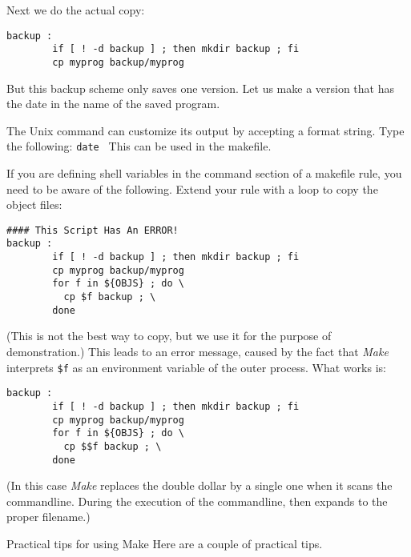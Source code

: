 Next we do the actual copy:
\begin{lstlisting}
backup :
        if [ ! -d backup ] ; then mkdir backup ; fi
        cp myprog backup/myprog
\end{lstlisting}
But this backup scheme only saves one version. Let us make a version
that has the date in the name of the saved program. 

The Unix  command can customize its output by accepting a
format string. Type the following: 
%
\verb+date +%
%
This can be used in the makefile.

\begin{nopackt}
\end{nopackt}

If you are defining shell variables in the command section of a
makefile rule, you need to be aware of the following. Extend your
 rule with a loop to copy the object files:
\begin{lstlisting}
#### This Script Has An ERROR!
backup :
        if [ ! -d backup ] ; then mkdir backup ; fi
        cp myprog backup/myprog
        for f in ${OBJS} ; do \
          cp $f backup ; \
        done
\end{lstlisting}
(This is not the best way to copy, but we use it for the purpose of
demonstration.) This leads to an error message, caused by the fact
that \emph{Make} interprets \verb+$f+ as an environment variable of
the outer process. What works is:
\begin{lstlisting}
backup :
        if [ ! -d backup ] ; then mkdir backup ; fi
        cp myprog backup/myprog
        for f in ${OBJS} ; do \
          cp $$f backup ; \
        done
\end{lstlisting}
(In this case \emph{Make} replaces the double dollar by a single one
when it scans the commandline. During the execution of the
commandline,  then expands to the proper filename.)

\Level 0 {Practical tips for using Make}
Here are a couple of practical tips.

